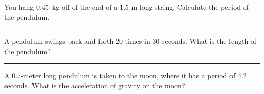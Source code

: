 \documentclass[12pt]{exam}
\begin{document}
\Large

\def\mystrut{\protect\rule[-2.2ex]{0ex}{2.2ex}} 
\qformat{ \textbf{Task \#\thequestion}
  \mystrut  \hfill}


\begin{questions}


\question
  You hang 0.45~kg off of the end of a 1.5-m long string.  Calculate the period of the pendulum.

\vs \hrule \vs

\question
  A pendulum swings back and forth 20 times in 30 seconds.  What is the length of the pendulum? 


\vs \hrule \vs


\question
  A 0.7-meter long pendulum is taken to the moon, where it has a period of 4.2 seconds.  What is the acceleration of gravity on the moon?
  \vs 




\end{questions}
\end{document}
